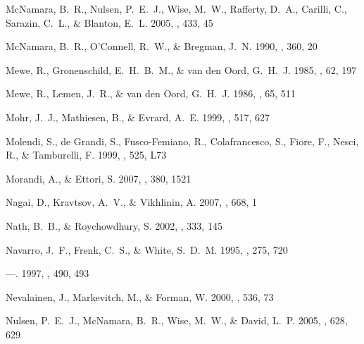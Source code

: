 \documentclass[12pt,preprint]{aastex}
\begin{document}
\begin{thebibliography}{137}
{McNamara}, B.~R., {Nulsen}, P.~E.~J., {Wise}, M.~W., {Rafferty}, D.~A.,
  {Carilli}, C., {Sarazin}, C.~L., \& {Blanton}, E.~L. 2005, \nat, 433, 45

{McNamara}, B.~R., {O'Connell}, R.~W., \& {Bregman}, J.~N. 1990, \apj, 360, 20

{Mewe}, R., {Gronenschild}, E.~H.~B.~M., \& {van den Oord}, G.~H.~J. 1985,
  \aaps, 62, 197

{Mewe}, R., {Lemen}, J.~R., \& {van den Oord}, G.~H.~J. 1986, \aaps, 65, 511

{Mohr}, J.~J., {Mathiesen}, B., \& {Evrard}, A.~E. 1999, \apj, 517, 627

{Molendi}, S., {de Grandi}, S., {Fusco-Femiano}, R., {Colafrancesco}, S.,
  {Fiore}, F., {Nesci}, R., \& {Tamburelli}, F. 1999, \apjl, 525, L73

{Morandi}, A., \& {Ettori}, S. 2007, \mnras, 380, 1521

{Nagai}, D., {Kravtsov}, A.~V., \& {Vikhlinin}, A. 2007, \apj, 668, 1

{Nath}, B.~B., \& {Roychowdhury}, S. 2002, \mnras, 333, 145

{Navarro}, J.~F., {Frenk}, C.~S., \& {White}, S.~D.~M. 1995, \mnras, 275, 720

---. 1997, \apj, 490, 493

{Nevalainen}, J., {Markevitch}, M., \& {Forman}, W. 2000, \apj, 536, 73

{Nulsen}, P.~E.~J., {McNamara}, B.~R., {Wise}, M.~W., \& {David}, L.~P. 2005,
  \apj, 628, 629


\end{thebibliography}
\end{document}
